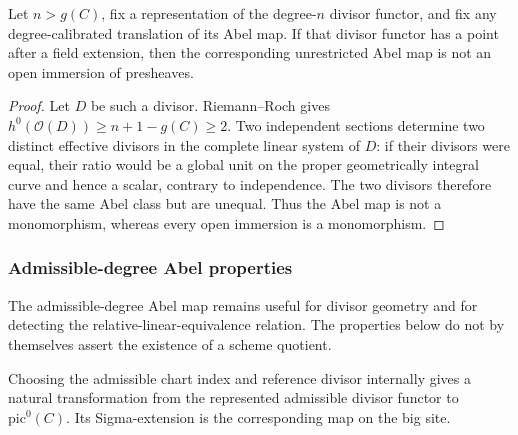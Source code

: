 \begin{theorem}
  \label{pa-thm:highDegreeAbel_notOpenImmersion}
  \leanok


  Let \(n>g(C)\), fix a representation of the degree-\(n\) divisor functor, and fix any
  degree-calibrated translation of its Abel map.  If that divisor functor has a point after a
  field extension, then the corresponding unrestricted Abel map is not an open immersion of
  presheaves.
\end{theorem}
\begin{proof}
  Let \(D\) be such a divisor.  Riemann--Roch gives
  \(h^0(\mathcal O(D))\ge n+1-g(C)\ge2\).  Two independent sections determine two distinct
  effective divisors in the complete linear system of \(D\): if their divisors were equal,
  their ratio would be a global unit on the proper geometrically integral curve and hence a
  scalar, contrary to independence.  The two divisors therefore have the same Abel class but
  are unequal.  Thus the Abel map is not a monomorphism, whereas every open immersion is a
  monomorphism.
\end{proof}

\subsubsection{Admissible-degree Abel properties}

The admissible-degree Abel map remains useful for divisor geometry and for detecting the
relative-linear-equivalence relation.  The properties below do not by themselves assert the
existence of a scheme quotient.

\begin{definition}
  \label{pa-def:admissibleAbelMap}
  \leanok

  Choosing the admissible chart index and reference divisor internally gives a natural
  transformation from the represented admissible divisor functor to
  \(\mathrm{pic}^0(C)\).  Its Sigma-extension is the corresponding map on the big site.
\end{definition}

